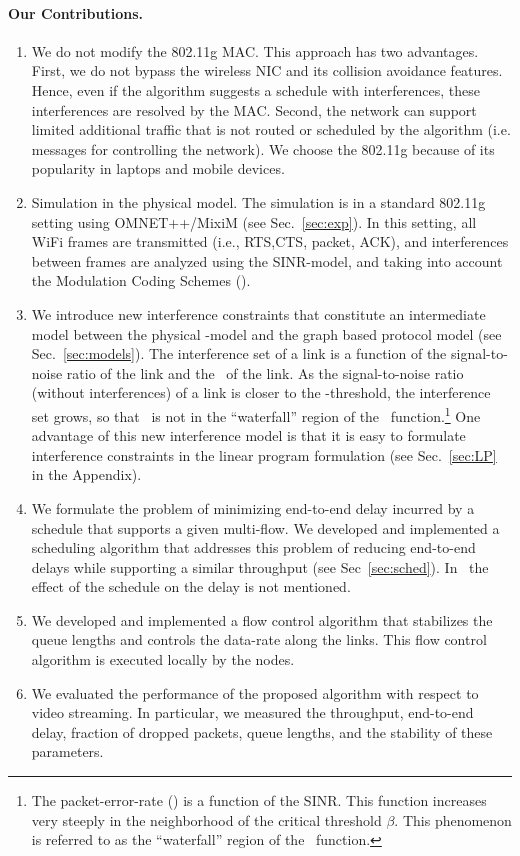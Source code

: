 \documentclass[12pt]{article}
\newenvironment{proof sketch}[1]{\noindent {\emph{Proof sketch of #1:}}}{\hfill \qed}
\newcommand{\SINR}{\text{\sc{sinr}}}
\newcommand{\PER}{\text{\sc{per}}}
\newcommand{\MCS}{\text{\sc{mcs}}}
\begin{document}
\paragraph{Our Contributions.}
\begin{enumerate}
\item We do not modify the 802.11g MAC. This approach has two
  advantages. First, we do not bypass the wireless NIC and its
  collision avoidance features. Hence, even if the algorithm suggests
  a schedule with interferences, these interferences are resolved by
  the MAC. Second, the network can support limited additional traffic
  that is not routed or scheduled by the algorithm (i.e. messages for
  controlling the network). We choose the 802.11g because of its
  popularity in laptops and mobile devices.
\item Simulation in the physical model. The simulation is in a
  standard 802.11g setting using OMNET++/MixiM (see
  Sec.~\ref{sec:exp}).  In this setting, all WiFi frames are
  transmitted (i.e., RTS,CTS, packet, ACK), and interferences between
  frames are analyzed using the SINR-model, and taking into account
  the Modulation Coding Schemes (\MCS).
\item We introduce new interference constraints that constitute an
  intermediate model between the physical \SINR-model and the graph
  based protocol model (see Sec.~\ref{sec:models}). The interference
  set of a link is a function of the signal-to-noise ratio of the link
  and the \MCS\ of the link.  As the signal-to-noise ratio (without
  interferences) of a link is closer to the \SINR-threshold, the
  interference set grows, so that \SINR\ is not in the ``waterfall''
  region of the \PER\ function.\footnote{The packet-error-rate (\PER)
    is a function of the SINR. This function increases very steeply in
    the neighborhood of the critical threshold $\beta$. This
    phenomenon is referred to as the ``waterfall'' region of the \PER\
    function.  }  One advantage of this new interference model is that
  it is easy to formulate interference constraints in the linear
  program formulation (see Sec.~\ref{sec:LP} in the Appendix).
\item We formulate the problem of minimizing end-to-end delay incurred
  by a schedule that supports a given multi-flow. We developed and
  implemented a scheduling algorithm that addresses this problem of
  reducing end-to-end delays while supporting a similar throughput
  (see Sec~\ref{sec:sched}).
  In~\cite{kumar2005algorithmic,alicherry2005joint11,buragohain2007improved}
  the effect of the schedule on the delay is not mentioned.
\item We developed and implemented a flow control algorithm that
  stabilizes the queue lengths and controls the data-rate along the
  links.  This flow control algorithm is executed locally by the
  nodes.
\item We evaluated the performance of the proposed algorithm with
  respect to video streaming. In particular, we measured the
  throughput, end-to-end delay, fraction of dropped packets, queue
  lengths, and the stability of these parameters.
\end{enumerate}
\end{document}
